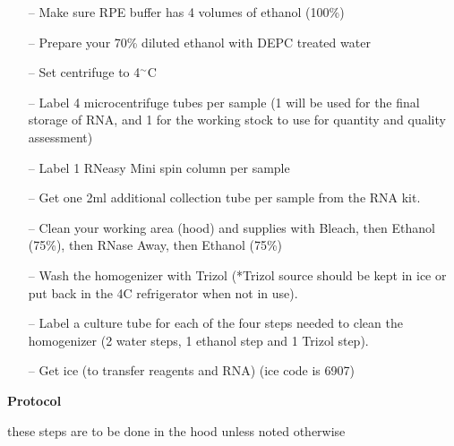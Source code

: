 \documentclass[11pt, oneside]{article}
\begin{document}
			\begin{itemize}
				\itemsep0em
				\item[--] Make sure RPE buffer has 4 volumes of ethanol (100\%)
				\item[--] Prepare your 70\% diluted ethanol with DEPC treated water
				\item[--] Set centrifuge to 4$^{\sim}$C
				\item[--] Label 4 microcentrifuge tubes per sample (1 will be used for the final storage of RNA, and 1 for the working stock to use for 					quantity and quality assessment)
				\item[--] Label 1 RNeasy Mini spin column per sample
				\item[--] Get one 2ml additional collection tube per sample from the RNA kit. 
				\item[--] Clean your working area (hood) and supplies with Bleach, then Ethanol (75\%), then RNase Away, then Ethanol (75\%)
				\item[--] Wash the homogenizer with Trizol (*Trizol source should be kept in ice or put back in the 4C refrigerator when not in use). 
				\item[--] Label a culture tube for each of the four steps needed to clean the homogenizer (2 water steps, 1 ethanol step and 1 Trizol 					step). 
				\item[--] Get ice (to transfer reagents and RNA) (ice code is 6907)
			\end{itemize}
				
			\vspace{3mm}
			
		{\bf Protocol}
			
		\noindent *these steps are to be done in the hood unless noted otherwise
	
\end{document}
